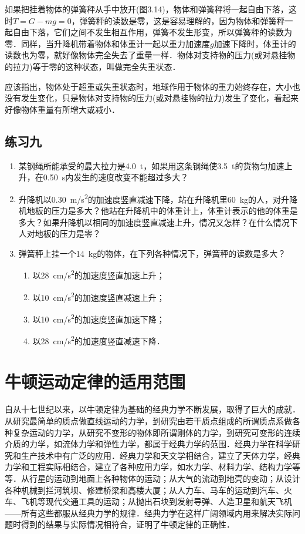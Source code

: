 如果把挂着物体的弹簧秤从手中放开(图3.14)，物体和弹簧秤将一起自由下落，这时$T=G-mg=0$，弹簧秤的读数是零，这是容易理解的，因为物体和弹簧秤一起自由下落，它们之间不发生相互作用，弹簧不发生形变，所以弹簧秤的读数为零．同样，当升降机带着物体和体重计一起以重力加速度$g$加速下降时，体重计的读数也为零，就好像物体完全失去了重量一样．物体对支持物的压力(或对悬挂物的拉力)等于零的这种状态，叫做完全失重状态．

应该指出，物体处于超重或失重状态时，地球作用于物体的重力始终存在，大小也没有发生变化，只是物体对支持物的压力(或对悬挂物的拉力)发生了变化，看起来好像物体重量有所增大或减小．


\subsection*{练习九}
\begin{enumerate}
    \item 某钢绳所能承受的最大拉力是\SI{4.0}{t}，如果用这条钢绳使\SI{3.5}{t}的货物匀加速上升，在\SI{0.50}{s}内发生的速度改变不能超过多大？
    \item 升降机以\SI{0.30}{m/s^2}的加速度竖直减速下降，站在升降机里\SI{60}{kg}的人，对升降机地板的压力是多大？他站在升降机中的体重计上，体重计表示的他的体重是多大？如果升降机以相同的加速度竖直减速上升，情况又怎样？在什么情况下人对地板的压力是零？
    \item 弹簧秤上挂一个\SI{14}{kg}的物体，在下列各种情况下，弹簧秤的读数是多大？
          \begin{enumerate}
              \item 以\SI{28}{cm/s^2}的加速度竖直加速上升；
              \item 以\SI{10}{cm/s^2}的加速度竖直减速上升；
              \item 以\SI{10}{cm/s^2}的加速度竖直加速下降；
              \item 以\SI{28}{cm/s^2}的加速度竖直减速下降．
          \end{enumerate}
\end{enumerate}
\newpage
\section{牛顿运动定律的适用范围}
自从十七世纪以来，以牛顿定律为基础的经典力学不断发展，取得了巨大的成就．从研究最简单的质点做直线运动的力学，到研究由若干质点组成的所谓质点系做各种复杂运动的力学，从研究不变形的物体即所谓刚体的力学，到研究可变形的连续介质的力学，如流体力学和弹性力学，都属于经典力学的范围．经典力学在科学研究和生产技术中有广泛的应用．经典力学和天文学相结合，建立了天体力学，经典力学和工程实际相结合，建立了各种应用力学，如水力学、材料力学、结构力学等等．从行星的运动到地面上各种物体的运动；从大气的流动到地壳的变动；从设计各种机械到拦河筑坝、修建桥梁和高楼大厦；从人力车、马车的运动到汽车、火车、飞机等现代交通工具的运动；从抛出石块到发射导弹、人造卫星和航天飞机——所有这些都服从经典力学的规律．经典力学在这样广阔领域内用来解决实际问题时得到的结果与实际情况相符合，证明了牛顿定律的正确性．

